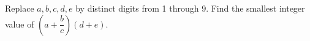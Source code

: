 Replace $a,b,c,d,e$ by distinct digits from 1 through 9. Find the smallest integer value of $(a + \dfrac{b}{c}) (d+e)$.
